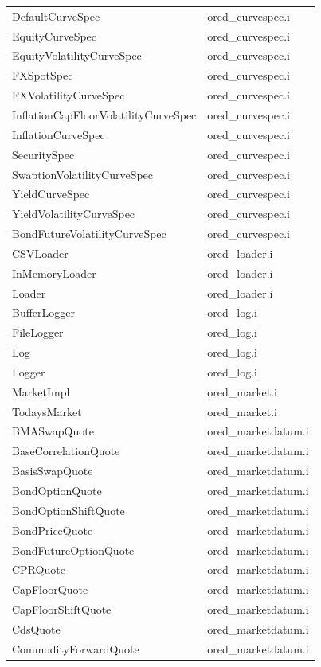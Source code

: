 \documentclass[12pt, a4paper]{report}
\begin{document}
\begin{appendix}
{\begin{longtable}{|l|l|}
DefaultCurveSpec & ored\_curvespec.i \\
EquityCurveSpec & ored\_curvespec.i \\
EquityVolatilityCurveSpec & ored\_curvespec.i \\
FXSpotSpec & ored\_curvespec.i \\
FXVolatilityCurveSpec & ored\_curvespec.i \\
InflationCapFloorVolatilityCurveSpec & ored\_curvespec.i \\
InflationCurveSpec & ored\_curvespec.i \\
SecuritySpec & ored\_curvespec.i \\
SwaptionVolatilityCurveSpec & ored\_curvespec.i \\
YieldCurveSpec & ored\_curvespec.i \\
YieldVolatilityCurveSpec & ored\_curvespec.i \\
BondFutureVolatilityCurveSpec & ored\_curvespec.i \\
CSVLoader & ored\_loader.i \\
InMemoryLoader & ored\_loader.i \\
Loader & ored\_loader.i \\
BufferLogger & ored\_log.i \\
FileLogger & ored\_log.i \\
Log & ored\_log.i \\
Logger & ored\_log.i \\
MarketImpl & ored\_market.i \\
TodaysMarket & ored\_market.i \\
BMASwapQuote & ored\_marketdatum.i \\
BaseCorrelationQuote & ored\_marketdatum.i \\
BasisSwapQuote & ored\_marketdatum.i \\
BondOptionQuote & ored\_marketdatum.i \\
BondOptionShiftQuote & ored\_marketdatum.i \\
BondPriceQuote & ored\_marketdatum.i \\
BondFutureOptionQuote & ored\_marketdatum.i \\
CPRQuote & ored\_marketdatum.i \\
CapFloorQuote & ored\_marketdatum.i \\
CapFloorShiftQuote & ored\_marketdatum.i \\
CdsQuote & ored\_marketdatum.i \\
CommodityForwardQuote & ored\_marketdatum.i \\

\end{longtable}}
\end{appendix}
\end{document}
